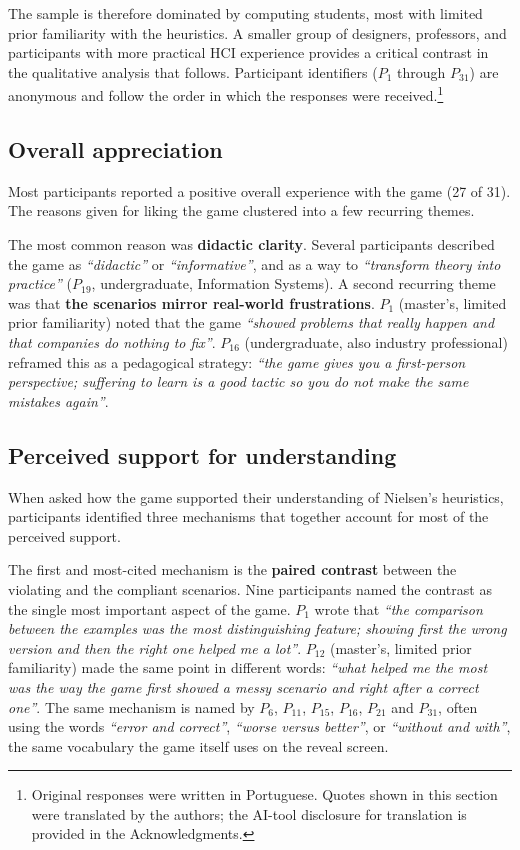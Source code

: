 The sample is therefore dominated by computing students, most with limited prior familiarity with the heuristics. A smaller group of designers, professors, and participants with more practical HCI experience provides a critical contrast in the qualitative analysis that follows. Participant identifiers ($P_1$ through $P_{31}$) are anonymous and follow the order in which the responses were received.\footnote{Original responses were written in Portuguese. Quotes shown in this section were translated by the authors; the AI-tool disclosure for translation is provided in the Acknowledgments.}

\subsection{Overall appreciation}
\label{sec:results:t1}

Most participants reported a positive overall experience with the game (27 of 31). The reasons given for liking the game clustered into a few recurring themes.

The most common reason was \textbf{didactic clarity}. Several participants described the game as \textit{``didactic''} or \textit{``informative''}, and as a way to \textit{``transform theory into practice''} ($P_{19}$, undergraduate, Information Systems). A second recurring theme was that \textbf{the scenarios mirror real-world frustrations}. $P_1$ (master's, limited prior familiarity) noted that the game \textit{``showed problems that really happen and that companies do nothing to fix''}. $P_{16}$ (undergraduate, also industry professional) reframed this as a pedagogical strategy: \textit{``the game gives you a first-person perspective; suffering to learn is a good tactic so you do not make the same mistakes again''}.

\subsection{Perceived support for understanding}
\label{sec:results:t2}

When asked how the game supported their understanding of Nielsen's heuristics, participants identified three mechanisms that together account for most of the perceived support.

The first and most-cited mechanism is the \textbf{paired contrast} between the violating and the compliant scenarios. Nine participants named the contrast as the single most important aspect of the game. $P_1$ wrote that \textit{``the comparison between the examples was the most distinguishing feature; showing first the wrong version and then the right one helped me a lot''}. $P_{12}$ (master's, limited prior familiarity) made the same point in different words: \textit{``what helped me the most was the way the game first showed a messy scenario and right after a correct one''}. The same mechanism is named by $P_6$, $P_{11}$, $P_{15}$, $P_{16}$, $P_{21}$ and $P_{31}$, often using the words \textit{``error and correct''}, \textit{``worse versus better''}, or \textit{``without and with''}, the same vocabulary the game itself uses on the reveal screen.

